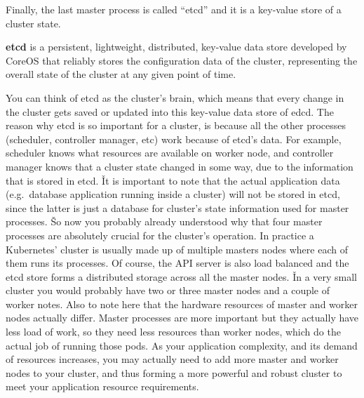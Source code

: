 Finally, the last master process is called ``etcd'' and it is a key-value store of a cluster state.

\bd[etcd]
\textbf{etcd} is a persistent, lightweight, distributed, key-value data store developed by CoreOS that reliably
stores the configuration data of the cluster, representing the overall state of the cluster at any given point of
time.
\ed


You can think of etcd as the cluster's brain, which means that every change in the cluster gets saved or updated into
this key-value data store of edcd. The reason why etcd is so important for a cluster, is because all the other
processes (scheduler, controller manager, etc) work because of etcd's data. For example, scheduler knows what
resources are available on worker node, and controller manager knows that a cluster state changed in some way, due to
the information that is stored in etcd. \v

It is important to note that the actual application data (e.g.\ database application running inside a cluster) will not
be stored in etcd, since the latter is just a database for cluster's state information used for master processes. \v

So now you probably already understood why that four master processes are absolutely crucial for the cluster's
operation. In practice a Kubernetes' cluster is usually made up of multiple masters nodes where each of them runs its
processes. Of course, the API server is also load balanced and the etcd store forms a distributed storage across all
the master nodes. \v

In a very small cluster you would probably have two or three master nodes and a couple of worker notes. Also to note
here that the hardware resources of master and worker nodes actually differ. Master processes are more important but
they actually have less load of work, so they need less resources than worker nodes, which do the actual job of
running those pods. As your application complexity, and its demand of resources increases, you may actually need to
add more master and worker nodes to your cluster, and thus forming a more powerful and robust cluster to meet your
application resource requirements.

